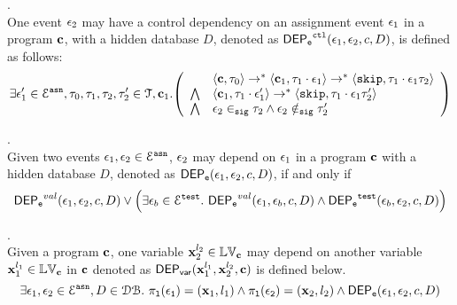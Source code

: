 %
\begin{defn}
\label{def:event_ctldep}.
\\
One event $\mathtt{\epsilon}_2$ may have a control dependency on an assignment event $\mathtt{\epsilon}_1$
in a program ${\boldsymbol{\mathbf{c}}}$, with a hidden database $D$, 
denoted as 
%
$\mathsf{DEP_{\mathtt{e}}}^{\mathtt{{ctl}}}(\mathtt{\epsilon}_1, \mathtt{\epsilon}_2, c, D)$, is defined as follows: 
%
\[
\exists \event_1' \in \eventset^{\asn}, \vtrace_0,
\vtrace_1, \vtrace_2, \vtrace_2' \in \mathcal{T}, \ssa{c}_1.
  \left(
  \begin{array}{ll}   
  & \config{\ssa{c}, \vtrace_0} \rightarrow^{*} 
    \config{\ssa{c}_1, \vtrace_1 \cdot \event_1}  \rightarrow^{*} 
    \config{\eskip,  \vtrace_1 \cdot \event_1 \vtrace_2} 
  \\ 
  \bigwedge &
  \config{\ssa{c}_1, \vtrace_1 \cdot \event_1'}  \rightarrow^{*} 
  \config{\eskip,  \vtrace_1 \cdot \event_1 \vtrace_2' } 
  \\
  \bigwedge &
  \event_2 \sigin \vtrace_2 \land \event_2 \notsigin \vtrace_2'
\end{array}
\right)
 \]
%
\end{defn}
%
%
\begin{defn}.
\label{def:event_dep}
\\ 
Given two events $\mathtt{\epsilon}_1, \mathtt{\epsilon}_2 \in \mathcal{E}^{\mathtt{{asn}}}$,
$\mathtt{\epsilon}_2$ may depend on $\mathtt{\epsilon}_1$ in a program ${\boldsymbol{\mathbf{c}}}$ with a hidden database $D$, denoted as $\mathsf{DEP_{\mathtt{e}}}(\mathtt{\epsilon}_1, \mathtt{\epsilon}_2, c, D)$,
if and only if
%
\[
\mathsf{DEP_{\mathtt{e}}}^{val}(\mathtt{\epsilon}_1, \mathtt{\epsilon}_2, c, D) 
\lor
\Big(
\exists \mathtt{\epsilon}_b \in \mathcal{E}^{\mathtt{{test}}}. ~ \mathsf{DEP_{\mathtt{e}}}^{val}(\mathtt{\epsilon}_1, \mathtt{\epsilon}_b, c, D) 
\land \mathsf{DEP_{\mathtt{e}}}^{\mathtt{{test}}}(\mathtt{\epsilon}_b, \mathtt{\epsilon}_2, c, D) 
\Big)
\] 
%
%
\end{defn}
%
\begin{defn}.
\label{def:var_dep}
\\
Given a program ${\boldsymbol{\mathbf{c}}}$, 
one variable ${\boldsymbol{\mathbf{x}}}_2^{l_2} \in \mathbb{LV}_{{\boldsymbol{\mathbf{c}}}}$ may depend on another variable 
${\boldsymbol{\mathbf{x}}}_1^{l_1} \in \mathbb{LV}_{{\boldsymbol{\mathbf{c}}}}$ in ${\boldsymbol{\mathbf{c}}}$ denoted as 
%
$\mathsf{DEP_{var}}({\boldsymbol{\mathbf{x}}}_1^{l_1}, {\boldsymbol{\mathbf{x}}}_2^{l_2}, {\boldsymbol{\mathbf{c}}})$ is defined below.
%
\[
\exists \mathtt{\epsilon}_1, \mathtt{\epsilon}_2 \in \mathcal{E}^{\mathtt{{asn}}}, D \in \mathcal{DB}. ~
\mathtt{\pi_{l}(\mathtt{\epsilon}_1)} = ({\boldsymbol{\mathbf{x}}}_1, l_1)
\land
\mathtt{\pi_{l}(\mathtt{\epsilon}_2)} = ({\boldsymbol{\mathbf{x}}}_2, l_2)
\land 
\mathsf{DEP_{\mathtt{e}}}(\mathtt{\epsilon}_1, \mathtt{\epsilon}_2, c, D)
\] 
%
%
\end{defn}
%
